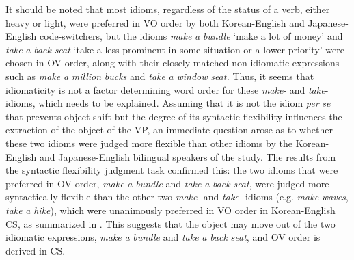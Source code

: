 It should be noted that most idioms, regardless of the status of a verb, either heavy or light, were preferred in \ac{VO} order by both Korean-English and Japanese-English code-switchers, but the idioms \textit{make} \textit{a} \textit{bundle} ‘make a lot of money’ and \textit{take} \textit{a} \textit{back} \textit{seat} ‘take a less prominent in some situation or a lower priority’ were chosen in \ac{OV} order, along with their closely matched non-idiomatic expressions such as \textit{make} \textit{a} \textit{million} \textit{bucks} and \textit{take} \textit{a} \textit{window} \textit{seat.} Thus, it seems that idiomaticity is not a factor determining word order for these \textit{make}{}- and \textit{take}{}-idioms, which needs to be explained. Assuming that it is not the idiom \textit{per} \textit{se} that prevents object shift but the degree of its syntactic flexibility influences the extraction of the object of the \acs{VP}, an immediate question arose as to whether these two idioms were judged more flexible than other idioms by the Korean-English and Japanese-English bilingual speakers of the study. The results from the syntactic flexibility judgment task confirmed this:  the two idioms that were preferred in \ac{OV} order, \textit{make} \textit{a} \textit{bundle} and \textit{take} \textit{a} \textit{back} \textit{seat}, were judged more syntactically flexible than the other two \textit{make}{}- and \textit{take}{}- idioms (e.g. \textit{make} \textit{waves}, \textit{take} \textit{a} \textit{hike}), which were unanimously preferred in \ac{VO} order in Korean-English \ac{CS}, as summarized in . This suggests that the object may move out of the two idiomatic expressions, \textit{make} \textit{a} \textit{bundle} and \textit{take} \textit{a} \textit{back} \textit{seat}, and \ac{OV} order is derived in \ac{CS}. 

\begin{table}
\caption{Word order predicted by syntactic flexibility scores for \textit{make}- and \textit{take}-idioms in Korean-English \textsc{cs}}
\label{tab:5.9}
\end{table}

